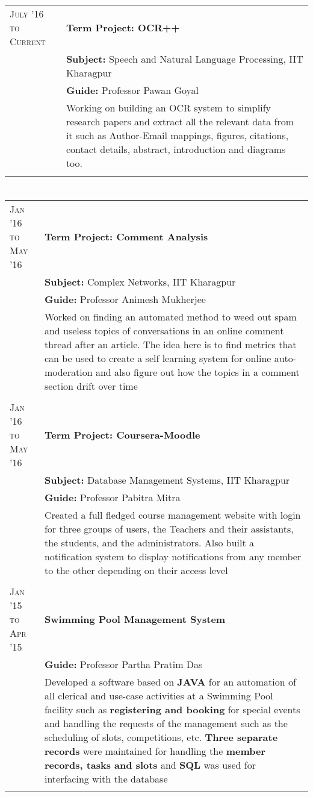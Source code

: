 \documentclass[a4paper,10pt]{extarticle} %
\begin{document}
\begin{tabular}{R{3.0cm}|p{15.0cm}}
\textsc{July '16 to Current} & \textbf{Term Project: OCR++} \\
 & \textbf{Subject: }\textmd{Speech and Natural Language Processing}, IIT Kharagpur\\
& \textbf{Guide: }\textmd{Professor Pawan Goyal}\\
& \textmd{Working on building an OCR system to simplify research papers and extract all the relevant data from it such as Author-Email mappings, figures, citations, contact details, abstract, introduction and diagrams too. }\\
\end{tabular}
\section{ }
\begin{tabular}{R{3.0cm}|p{15.0cm}}

\textsc{Jan '16 to May '16} & \textbf{Term Project: Comment Analysis} \\
 & \textbf{Subject: }\textmd{Complex Networks,} IIT Kharagpur\\
& \textbf{Guide: }\textmd{Professor Animesh Mukherjee}\\
& \textmd{Worked on finding an automated method to weed out spam and useless topics of conversations in an online comment thread after an article. The idea here is to find metrics that can be used to create a self learning system for online auto-moderation and also figure out how the topics in a comment section drift over time }\\
 \\

\textsc{Jan '16 to May '16} & \textbf{Term Project: Coursera-Moodle} \\
 & \textbf{Subject: }\textmd{Database Management Systems,} IIT Kharagpur\\
& \textbf{Guide: }\textmd{Professor Pabitra Mitra}\\
& \textmd{Created a full fledged course management website with login for three groups of users, the Teachers and their assistants, the students, and the administrators. Also built a notification system to display notifications from any member to the other depending on their access level}\\
 \\


\textsc{Jan '15 to Apr '15} & \textbf{Swimming Pool Management System}\\
& \textbf{Guide: }\textmd{Professor Partha Pratim Das}\\
& \textmd{Developed a software based on \textbf{JAVA} for an automation of all clerical and use-case activities at a Swimming Pool facility such as \textbf{registering and booking} for special events and handling the requests of the management such as the scheduling of slots, competitions, etc. \textbf{Three separate records} were maintained for handling the \textbf{member records, tasks and slots} and \textbf{SQL} was used for interfacing with the database}\\
 \\


\end{tabular}
\end{document}
